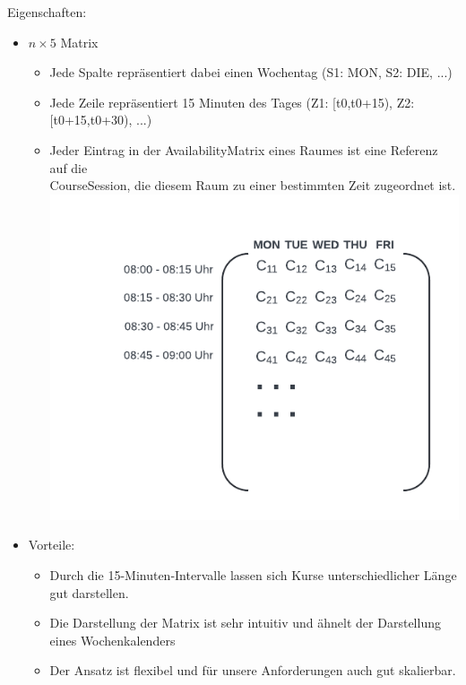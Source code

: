 \documentclass{article}
\begin{document}
	
	Eigenschaften:
	\begin{itemize}
		\item $n \times 5$ Matrix
		\begin{itemize}
			\item Jede Spalte repräsentiert dabei einen Wochentag (S1: MON, S2: DIE, ...)
			\item Jede Zeile repräsentiert 15 Minuten des Tages (Z1: [t0,t0+15), Z2: [t0+15,t0+30), ...)
			\item Jeder Eintrag in der AvailabilityMatrix eines Raumes ist eine Referenz auf die\\ CourseSession, die diesem Raum zu einer bestimmten Zeit zugeordnet ist.\\
			\includegraphics{AvailabilityMatrix}
		\end{itemize}
		\item Vorteile:
		\begin{itemize}
			\item Durch die 15-Minuten-Intervalle lassen sich Kurse unterschiedlicher Länge gut darstellen.
			\item Die Darstellung der Matrix ist sehr intuitiv und ähnelt der Darstellung eines Wochenkalenders
			\item Der Ansatz ist flexibel und für unsere Anforderungen auch gut skalierbar.
		\end{itemize}
	\end{itemize}
	
	
	
	
	
	
	
	
	
	
	
	
	
	
	
	
	
	
	
	
	
	
	
	
	
	
	
	
\end{document}
